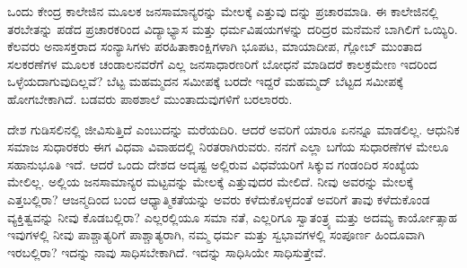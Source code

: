 ಒಂದು ಕೇಂದ್ರ ಕಾಲೇಜಿನ ಮೂಲಕ ಜನಸಾಮಾನ್ಯರನ್ನು ಮೇಲಕ್ಕೆ ಎತ್ತುವು ದನ್ನು ಪ್ರಚಾರಮಾಡಿ. ಈ ಕಾಲೇಜಿನಲ್ಲಿ ತರಬೇತನ್ನು ಪಡೆದ ಪ್ರಚಾರಕರಿಂದ ವಿದ್ಯಾಭ್ಯಾಸ ಮತ್ತು ಧರ್ಮವಿಷಯಗಳನ್ನು ದರಿದ್ರರ ಮನೆಮನೆ ಬಾಗಿಲಿಗೆ ಒಯ್ಯಿರಿ. ಕೆಲವರು ಅನಾಸಕ್ತರಾದ ಸಂನ್ಯಾಸಿಗಳು ಪರಹಿತಾಕಾಂಕ್ಷಿಗಳಾಗಿ ಭೂಪಟ, ಮಾಯಾದೀಪ, ಗ್ಲೋಬ್ ಮುಂತಾದ ಸಲಕರಣೆಗಳ ಮೂಲಕ ಚಂಡಾಲನವರೆಗೆ ಎಲ್ಲ ಜನಸಾಧಾರಣರಿಗೆ ಬೋಧನೆ ಮಾಡಿದರೆ ಕಾಲಕ್ರಮೇಣ ಇದರಿಂದ ಒಳ್ಳೆಯದಾಗುವುದಿಲ್ಲವೆ? ಬೆಟ್ಟ ಮಹಮ್ಮದನ ಸಮೀಪಕ್ಕೆ ಬರದೇ ಇದ್ದರೆ ಮಹಮ್ಮದ್ ಬೆಟ್ಟದ ಸಮೀಪಕ್ಕೆ ಹೋಗಬೇಕಾಗಿದೆ. ಬಡವರು ಪಾಠಶಾಲೆ ಮುಂತಾದುವುಗಳಿಗೆ ಬರಲಾರರು.

ದೇಶ ಗುಡಿಸಲಿನಲ್ಲಿ ಜೀವಿಸುತ್ತಿದೆ ಎಂಬುದನ್ನು ಮರೆಯದಿರಿ. ಆದರೆ ಅವರಿಗೆ ಯಾರೂ ಏನನ್ನೂ ಮಾಡಲಿಲ್ಲ. ಆಧುನಿಕ ಸಮಾಜ ಸುಧಾರಕರು ಈಗ ವಿಧವಾ ವಿವಾಹದಲ್ಲಿ ನಿರತರಾಗಿರುವರು. ನನಗೆ ಎಲ್ಲಾ ಬಗೆಯ ಸುಧಾರಣೆಗಳ ಮೇಲೂ ಸಹಾನುಭೂತಿ ಇದೆ. ಆದರೆ ಒಂದು ದೇಶದ ಅದೃಷ್ಟ ಅಲ್ಲಿರುವ ವಿಧವೆಯರಿಗೆ ಸಿಕ್ಕುವ ಗಂಡಂದಿರ ಸಂಖ್ಯೆಯ ಮೇಲಿಲ್ಲ. ಅಲ್ಲಿಯ ಜನಸಾಮಾನ್ಯರ ಮಟ್ಟವನ್ನು ಮೇಲಕ್ಕೆ ಎತ್ತುವುದರ ಮೇಲಿದೆ. ನೀವು ಅವರನ್ನು ಮೇಲಕ್ಕೆ ಎತ್ತಬಲ್ಲಿರಾ? ಆಜನ್ಮದಿಂದ ಬಂದ ಆಧ್ಯಾತ್ಮಿಕತೆಯನ್ನು ಅವರು ಕಳೆದುಕೊಳ್ಳದಂತೆ ಅವರಿಗೆ ತಾವು ಕಳೆದುಕೊಂಡ ವ್ಯಕ್ತಿತ್ವವನ್ನು ನೀವು ಕೊಡಬಲ್ಲಿರಾ? ಎಲ್ಲರಲ್ಲಿಯೂ ಸಮಾ ನತೆ, ಎಲ್ಲರಿಗೂ ಸ್ವಾತಂತ್ರ್ಯ ಮತ್ತು ಅದಮ್ಯ ಕಾರ್ಯೋತ್ಸಾಹ ಇವುಗಳಲ್ಲಿ ನೀವು ಪಾಶ್ಚಾತ್ಯರಿಗೆ ಪಾಶ್ಚಾತ್ಯರಾಗಿ, ನಮ್ಮ ಧರ್ಮ ಮತ್ತು ಸ್ವಭಾವಗಳಲ್ಲಿ ಸಂಪೂರ್ಣ ಹಿಂದೂವಾಗಿ ಇರಬಲ್ಲಿರಾ? ಇದನ್ನು ನಾವು ಸಾಧಿಸಬೇಕಾಗಿದೆ. ಇದನ್ನು ಸಾಧಿಸಿಯೇ ಸಾಧಿಸುತ್ತೇವೆ.

